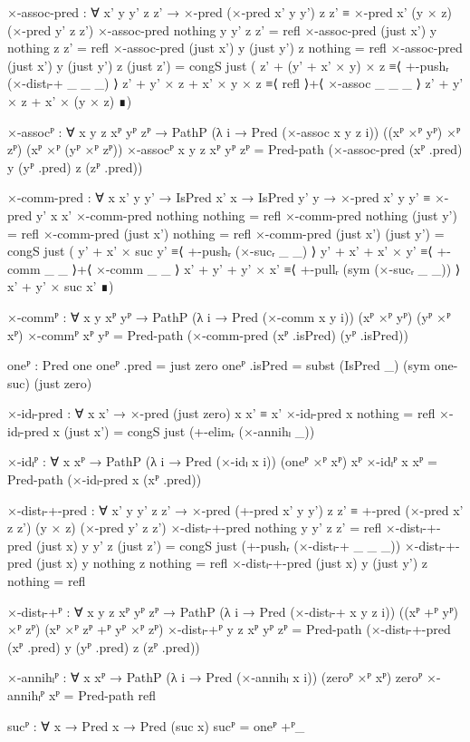 \begin{code}[hide]
  ×-assoc-pred :
    ∀ x' y y' z z' →
    ×-pred (×-pred x' y y') z z' ≡ ×-pred x' (y × z) (×-pred y' z z')
  ×-assoc-pred nothing y y' z z' = refl
  ×-assoc-pred (just x') y nothing z z' = refl
  ×-assoc-pred (just x') y (just y') z nothing = refl
  ×-assoc-pred (just x') y (just y') z (just z') =
    congS just
      ( z' + (y' + x' × y) × z     ≡⟨ +-pushᵣ (×-distₗ-+ _ _ _) ⟩
        z' + y' × z + x' × y × z   ≡⟨ refl ⟩+⟨ ×-assoc _ _ _ ⟩
        z' + y' × z + x' × (y × z) ∎)

  ×-assocᴾ : ∀ {x y z} xᴾ yᴾ zᴾ →
    PathP (λ i → Pred (×-assoc x y z i)) ((xᴾ ×ᴾ yᴾ) ×ᴾ zᴾ) (xᴾ ×ᴾ (yᴾ ×ᴾ zᴾ))
  ×-assocᴾ {x} {y} {z} xᴾ yᴾ zᴾ =
    Pred-path (×-assoc-pred (xᴾ .pred) y (yᴾ .pred) z (zᴾ .pred))

  ×-comm-pred :
    ∀ {x x' y y'} → IsPred x' x → IsPred y' y →
    ×-pred x' y y' ≡ ×-pred y' x x'
  ×-comm-pred nothing nothing = refl
  ×-comm-pred nothing (just y') = refl
  ×-comm-pred (just x') nothing = refl
  ×-comm-pred (just x') (just y') =
    congS just
      ( y' + x' × suc y'   ≡⟨ +-pushᵣ (×-sucᵣ _ _) ⟩
        y' + x' + x' × y' ≡⟨ +-comm _ _ ⟩+⟨ ×-comm _ _ ⟩
        x' + y' + y' × x' ≡⟨ +-pullᵣ (sym (×-sucᵣ _ _)) ⟩
        x' + y' × suc x' ∎)

  ×-commᴾ :
    ∀ {x y} xᴾ yᴾ → PathP (λ i → Pred (×-comm x y i)) (xᴾ ×ᴾ yᴾ) (yᴾ ×ᴾ xᴾ)
  ×-commᴾ xᴾ yᴾ = Pred-path (×-comm-pred (xᴾ .isPred) (yᴾ .isPred))

  oneᴾ : Pred one
  oneᴾ .pred = just zero
  oneᴾ .isPred = subst (IsPred _) (sym one-suc) (just zero)

  ×-idₗ-pred : ∀ x x' → ×-pred (just zero) x x' ≡ x'
  ×-idₗ-pred x nothing = refl
  ×-idₗ-pred x (just x') = congS just (+-elimᵣ (×-annihₗ _))

  ×-idₗᴾ : ∀ {x} xᴾ → PathP (λ i → Pred (×-idₗ x i)) (oneᴾ ×ᴾ xᴾ) xᴾ
  ×-idₗᴾ {x} xᴾ = Pred-path (×-idₗ-pred x (xᴾ .pred))

  ×-distₗ-+-pred :
    ∀ x' y y' z z' →
    ×-pred (+-pred x' y y') z z' ≡
    +-pred (×-pred x' z z') (y × z) (×-pred y' z z')
  ×-distₗ-+-pred nothing y y' z z' = refl
  ×-distₗ-+-pred (just x) y y' z (just z') =
    congS just (+-pushᵣ (×-distₗ-+ _ _ _))
  ×-distₗ-+-pred (just x) y nothing z nothing = refl
  ×-distₗ-+-pred (just x) y (just y') z nothing = refl

  ×-distₗ-+ᴾ :
    ∀ {x y z} xᴾ yᴾ zᴾ →
    PathP (λ i → Pred (×-distₗ-+ x y z i))
      ((xᴾ +ᴾ yᴾ) ×ᴾ zᴾ) (xᴾ ×ᴾ zᴾ +ᴾ yᴾ ×ᴾ zᴾ)
  ×-distₗ-+ᴾ {y} {z} xᴾ yᴾ zᴾ =
    Pred-path (×-distₗ-+-pred (xᴾ .pred) y (yᴾ .pred) z (zᴾ .pred))

  ×-annihₗᴾ : ∀ {x} xᴾ → PathP (λ i → Pred (×-annihₗ x i)) (zeroᴾ ×ᴾ xᴾ) zeroᴾ
  ×-annihₗᴾ xᴾ = Pred-path refl

  sucᴾ : ∀ {x} → Pred x → Pred (suc x)
  sucᴾ = oneᴾ +ᴾ_
\end{code}
